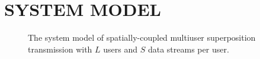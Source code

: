 \documentclass[conference]{IEEEtran}
\begin{document}




\section{SYSTEM MODEL}
\begin{figure}[ht]
\setlength{\abovecaptionskip}{-0cm}
\setlength{\belowcaptionskip}{-1cm}
  \caption{The system model of spatially-coupled multiuser superposition transmission with $L$ users and $S$ data streams per user.}\label{fig.1}
    \vspace{-2em}
\end{figure}
\end{document}
